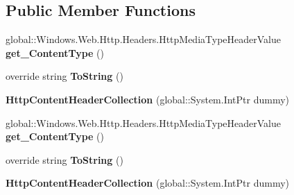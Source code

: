 \subsection*{Public Member Functions}
\begin{DoxyCompactItemize}
\item 
\mbox{\label{class_windows_1_1_web_1_1_http_1_1_headers_1_1_http_content_header_collection_a5ce805734ef5ec4015c3ea506d9cbfda}} 
global\+::\+Windows.\+Web.\+Http.\+Headers.\+Http\+Media\+Type\+Header\+Value {\bfseries get\+\_\+\+Content\+Type} ()
\item 
\mbox{\label{class_windows_1_1_web_1_1_http_1_1_headers_1_1_http_content_header_collection_ac697d36819174461b46140496a676ebd}} 
override string {\bfseries To\+String} ()
\item 
\mbox{\label{class_windows_1_1_web_1_1_http_1_1_headers_1_1_http_content_header_collection_a475d4ca481e61a83edd097367e9b1629}} 
{\bfseries Http\+Content\+Header\+Collection} (global\+::\+System.\+Int\+Ptr dummy)
\item 
\mbox{\label{class_windows_1_1_web_1_1_http_1_1_headers_1_1_http_content_header_collection_a5ce805734ef5ec4015c3ea506d9cbfda}} 
global\+::\+Windows.\+Web.\+Http.\+Headers.\+Http\+Media\+Type\+Header\+Value {\bfseries get\+\_\+\+Content\+Type} ()
\item 
\mbox{\label{class_windows_1_1_web_1_1_http_1_1_headers_1_1_http_content_header_collection_ac697d36819174461b46140496a676ebd}} 
override string {\bfseries To\+String} ()
\item 
\mbox{\label{class_windows_1_1_web_1_1_http_1_1_headers_1_1_http_content_header_collection_a475d4ca481e61a83edd097367e9b1629}} 
{\bfseries Http\+Content\+Header\+Collection} (global\+::\+System.\+Int\+Ptr dummy)
\item 

\end{DoxyCompactItemize}
